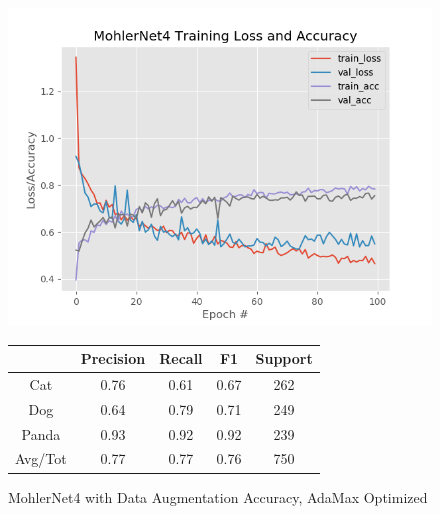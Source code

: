 \documentclass[12pt]{article}
\begin{document}
\begin{figure}[h]
	\centering %
	\captionsetup{justification=centering}
	\begin{minipage}{0.5\textwidth}
		\centering %
		\includegraphics[width=1\textwidth]{MohlerNet4_opt-Adamaxtests.png}
		\caption{MohlerNet4 with Data Augmentation Accuracy, AdaMax Optimized} \label{MN4Aug}
	\end{minipage}\hfill
	\begin{minipage}{0.5\textwidth}
		\begin{center}
			\begin{tabular}[5pt]{| c| c| c| c|c|}
				\hline
				& Precision & Recall & F1 & Support \\[0.5ex] 
				\hline 	
				Cat   &    0.76&	0.61&	0.67&	262\\ \hline 
				Dog    &   0.64&	0.79&	0.71&	249    \\ \hline 
				Panda   &  0.93&	0.92&	0.92&	239  \\ \hline 
				Avg/Tot  &   0.77&	0.77&	0.76&	750\\ \hline 
				
			\end{tabular}
			\label{MN4RAug}
		\end{center}	
	\end{minipage}
\end{figure}
\end{document}
